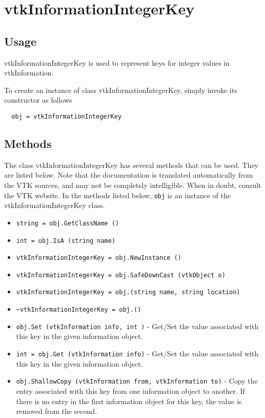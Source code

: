 \section{vtkInformationIntegerKey}

\subsection{Usage}

 vtkInformationIntegerKey is used to represent keys for integer values
 in vtkInformation.

To create an instance of class vtkInformationIntegerKey, simply
invoke its constructor as follows
\begin{verbatim}
  obj = vtkInformationIntegerKey
\end{verbatim}
\subsection{Methods}

The class vtkInformationIntegerKey has several methods that can be used.
  They are listed below.
Note that the documentation is translated automatically from the VTK sources,
and may not be completely intelligible.  When in doubt, consult the VTK website.
In the methods listed below, \verb|obj| is an instance of the vtkInformationIntegerKey class.
\begin{itemize}
\item  \verb|string = obj.GetClassName ()|

\item  \verb|int = obj.IsA (string name)|

\item  \verb|vtkInformationIntegerKey = obj.NewInstance ()|

\item  \verb|vtkInformationIntegerKey = obj.SafeDownCast (vtkObject o)|

\item  \verb|vtkInformationIntegerKey = obj.(string name, string location)|

\item  \verb|~vtkInformationIntegerKey = obj.()|

\item  \verb|obj.Set (vtkInformation info, int )| -  Get/Set the value associated with this key in the given
 information object.

\item  \verb|int = obj.Get (vtkInformation info)| -  Get/Set the value associated with this key in the given
 information object.

\item  \verb|obj.ShallowCopy (vtkInformation from, vtkInformation to)| -  Copy the entry associated with this key from one information
 object to another.  If there is no entry in the first information
 object for this key, the value is removed from the second.

\end{itemize}
